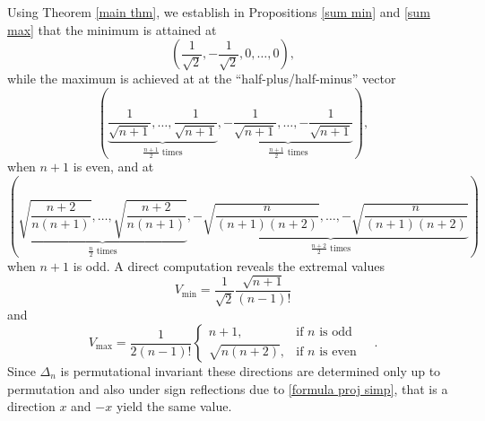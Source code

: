 \documentclass[10pt]{amsart}
\newcommand{\1}{\textbf{1}}
\numberwithin{equation}{section} %
\theoremstyle{remark}
\theoremstyle{definition}
\begin{document}
Using Theorem \ref{main thm}, we establish in Propositions \ref{sum min} and \ref{sum max} that the minimum is attained at $$ \left(\frac{1}{\sqrt{2}}, -\frac{1}{\sqrt{2}}, 0, \ldots, 0\right),$$
while the maximum is achieved at  at the “half-plus/half-minus” vector $$ \left(\underbrace{\frac{1}{\sqrt{n+1}}, \dots, \frac{1}{\sqrt{n+1}}}_{\frac{n+1}{2} \text{ times}}, \underbrace{-\frac{1}{\sqrt{n+1}}, \dots, -\frac{1}{\sqrt{n+1}}}_{\frac{n+1}{2}  \text{ times}}\right),$$ when \(n+1\) is even, and at $$\left(\underbrace{\sqrt{\frac{n+2}{n(n+1)}}, \ldots, \sqrt{\frac{n+2}{n(n+1)}}}_{\frac{n}{2} \text{ times}}, \underbrace{-\sqrt{\frac{n}{(n+1)(n+2)}}, \ldots, -\sqrt{\frac{n}{(n+1)(n+2)}}}_{\frac{n+2}{2} \text{ times}}\right)$$
when $n+1$ is odd. A direct computation reveals the extremal values
\[
V_{\text{min}}=\frac{1}{\sqrt{2}}\frac{\sqrt{n+1}}{(n-1)!}
\]
and 
\[
V_{\text{max}}=\frac{1}{2(n-1)!}\begin{cases} n+1, & \text{if } n \text{ is odd} \\ \sqrt{n(n+2)}, & \text{if } n \text{ is even} \end{cases}  \quad.
\]
Since $\Delta_n$  is permutational invariant these directions are determined only up to permutation and also under sign reflections due to \eqref{formula proj simp}, that is a direction $x$ and $-x$ yield the same value. 
\end{document}
